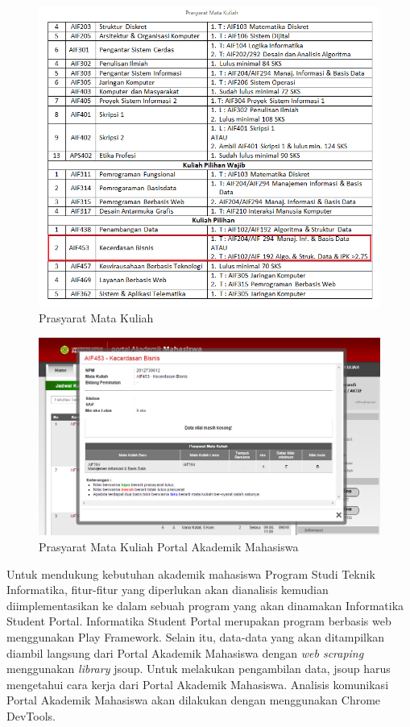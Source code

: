 \begin{figure}[H]
	\centering
	\includegraphics[scale=0.5]{Gambar/contoh-tinyurl}
	\caption{Prasyarat Mata Kuliah\cite{prasyaratIT}}
	\label{fig:1_prasyarat_tinyurl}
\end{figure}

\begin{figure}[H]
	\centering
	\includegraphics[scale=0.5]{Gambar/contoh-portal}
	\caption{Prasyarat Mata Kuliah Portal Akademik Mahasiswa\cite{studentportalunpar}}
	\label{fig:1_prasyarat_student_portal}
\end{figure}

Untuk mendukung kebutuhan akademik mahasiswa Program Studi Teknik Informatika, fitur-fitur yang diperlukan akan dianalisis kemudian diimplementasikan ke dalam sebuah program yang akan dinamakan Informatika Student Portal. Informatika Student Portal merupakan program berbasis web menggunakan Play Framework. Selain itu, data-data yang akan ditampilkan diambil langsung dari Portal Akademik Mahasiswa dengan \textit{web scraping} menggunakan \textit{library} jsoup. Untuk melakukan pengambilan data, jsoup harus mengetahui cara kerja dari Portal Akademik Mahasiswa. Analisis komunikasi Portal Akademik Mahasiswa akan dilakukan dengan menggunakan Chrome DevTools. 

